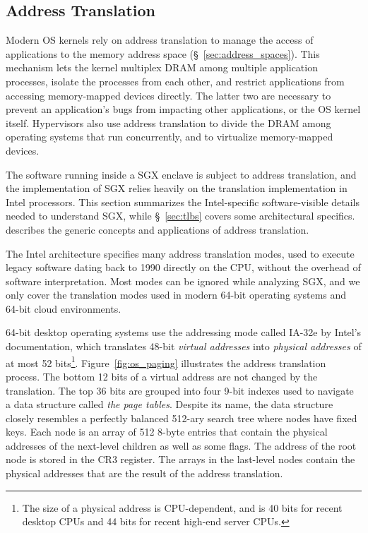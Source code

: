\subsection{Address Translation}
\label{sec:paging}

Modern OS kernels rely on address translation to manage the access of
applications to the memory address space (\S~\ref{sec:address_spaces}). This
mechanism lets the kernel multiplex DRAM among multiple application processes,
isolate the processes from each other, and restrict applications from accessing
memory-mapped devices directly. The latter two are necessary to prevent an
application's bugs from impacting other applications, or the OS kernel itself.
Hypervisors also use address translation to divide the DRAM among operating
systems that run concurrently, and to virtualize memory-mapped devices.

The software running inside a SGX enclave is subject to address
translation, and the implementation of SGX relies heavily on the translation
implementation in Intel processors. This section summarizes the Intel-specific
software-visible details needed to understand SGX, while \S~\ref{sec:tlbs}
covers some architectural specifics. \cite{jacob1998virtual} describes the
generic concepts and applications of address translation.

The Intel architecture specifies many address translation modes, used to
execute legacy software dating back to 1990 directly on the CPU, without the
overhead of software interpretation. Most modes can be ignored while analyzing
SGX, and we only cover the translation modes used in modern 64-bit operating
systems and 64-bit cloud environments.


64-bit desktop operating systems use the addressing mode called IA-32e by
Intel's documentation, which translates 48-bit \textit{virtual addresses} into
\textit{physical addresses} of at most 52 bits\footnote{The size of a physical
  address is CPU-dependent, and is 40 bits for recent desktop CPUs and 44 bits
for recent high-end server CPUs.}.  Figure~\ref{fig:os_paging} illustrates the
address translation process. The bottom 12 bits of a virtual address are not
changed by the translation. The top 36 bits are grouped into four 9-bit indexes
used to navigate a data structure called \textit{the page tables}. Despite its
name, the data structure closely resembles a perfectly balanced 512-ary search
tree where nodes have fixed keys.  Each node is an array of 512 8-byte entries
that contain the physical addresses of the next-level children as well as some
flags. The address of the root node is stored in the CR3 register. The arrays
in the last-level nodes contain the physical addresses that are the result of
the address translation.

